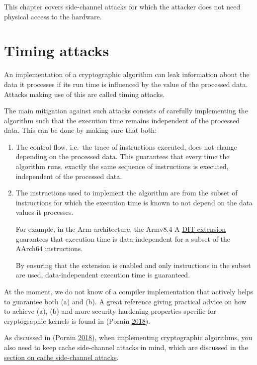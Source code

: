 \documentclass[a4paper,]{report}
\begin{document}
This chapter covers side-channel attacks for which the attacker does not
need physical access to the hardware.

\hypertarget{timing-attacks}{%
\section{Timing attacks}\label{timing-attacks}}

An implementation of a cryptographic algorithm can leak information
about the data it processes if its run time is influenced by the value
of the processed data. Attacks making use of this are called timing
attacks.

The main mitigation against such attacks consists of carefully
implementing the algorithm such that the execution time remains
independent of the processed data. This can be done by making sure that
both:

\begin{enumerate}
\def\labelenumi{\alph{enumi})}
\item
  The control flow, i.e.~the trace of instructions executed, does not
  change depending on the processed data. This guarantees that every
  time the algorithm runs, exactly the same sequence of instructions is
  executed, independent of the processed data.
\item
  The instructions used to implement the algorithm are from the subset
  of instructions for which the execution time is known to not depend on
  the data values it processes.

  For example, in the Arm architecture, the Armv8.4-A
  \href{https://developer.arm.com/documentation/ddi0595/2021-06/AArch64-Registers/DIT--Data-Independent-Timing}{DIT
  extension} guarantees that execution time is data-independent for a
  subset of the AArch64 instructions.

  By ensuring that the extension is enabled and only instructions in the
  subset are used, data-independent execution time is guaranteed.
\end{enumerate}

At the moment, we do not know of a compiler implementation that actively
helps to guarantee both (a) and (b). A great reference giving practical
advice on how to achieve (a), (b) and more security hardening properties
specific for cryptographic kernels is found in (Pornin
\protect\hyperlink{ref-Pornin2018}{2018}).

As discussed in (Pornin \protect\hyperlink{ref-Pornin2018}{2018}), when
implementing cryptographic algorithms, you also need to keep cache
side-channel attacks in mind, which are discussed in the
\protect\hyperlink{cache-side-channel-attacks}{section on cache
side-channel attacks}.
\end{document}
